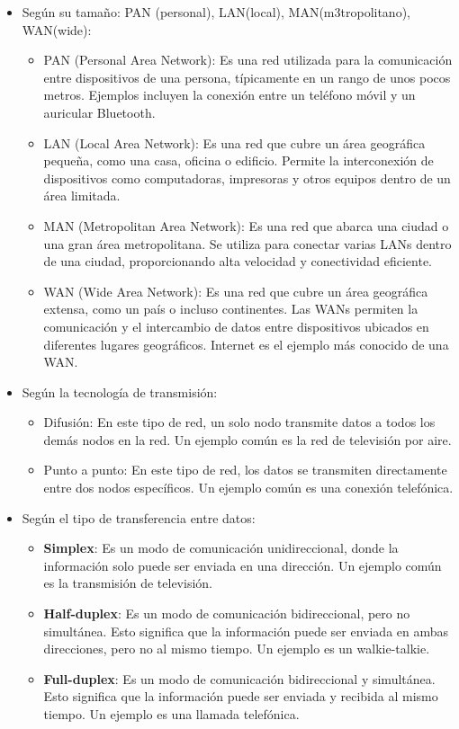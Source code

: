 \documentclass[a4paper,12pt]{article}
\begin{document}
\begin{itemize}
    \item Según su tamaño: PAN (personal), LAN(local), MAN(m3tropolitano), WAN(wide):
    \begin{itemize}
        \item PAN (Personal Area Network): Es una red utilizada para la comunicación entre dispositivos de una persona, típicamente en un rango de unos pocos metros. Ejemplos incluyen la conexión entre un teléfono móvil y un auricular Bluetooth.
        \item LAN (Local Area Network): Es una red que cubre un área geográfica pequeña, como una casa, oficina o edificio. Permite la interconexión de dispositivos como computadoras, impresoras y otros equipos dentro de un área limitada.
        \item MAN (Metropolitan Area Network): Es una red que abarca una ciudad o una gran área metropolitana. Se utiliza para conectar varias LANs dentro de una ciudad, proporcionando alta velocidad y conectividad eficiente.
        \item WAN (Wide Area Network): Es una red que cubre un área geográfica extensa, como un país o incluso continentes. Las WANs permiten la comunicación y el intercambio de datos entre dispositivos ubicados en diferentes lugares geográficos. Internet es el ejemplo más conocido de una WAN.
    \end{itemize}
    \item Según la tecnología de transmisión:
    \begin{itemize}
        \item Difusión: En este tipo de red, un solo nodo transmite datos a todos los demás nodos en la red. Un ejemplo común es la red de televisión por aire.
        \item Punto a punto: En este tipo de red, los datos se transmiten directamente entre dos nodos específicos. Un ejemplo común es una conexión telefónica.
    \end{itemize}
    \item Según el tipo de transferencia entre datos:
    \begin{itemize}
        \item \textbf{Simplex}: Es un modo de comunicación unidireccional, donde la información solo puede ser enviada en una dirección. Un ejemplo común es la transmisión de televisión.
        \item \textbf{Half-duplex}: Es un modo de comunicación bidireccional, pero no simultánea. Esto significa que la información puede ser enviada en ambas direcciones, pero no al mismo tiempo. Un ejemplo es un walkie-talkie.
        \item \textbf{Full-duplex}: Es un modo de comunicación bidireccional y simultánea. Esto significa que la información puede ser enviada y recibida al mismo tiempo. Un ejemplo es una llamada telefónica.
    \end{itemize}
\end{itemize}
\end{document}
